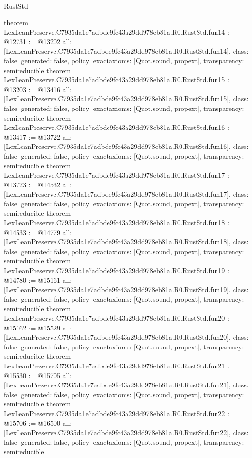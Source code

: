 \begin{lexlean}{RustStd}
\begin{coremodule}
{}
theorem LexLeanPreserve.C7935da1e7adbde9fc43a29dd978eb81a.R0.RustStd.fun14 : @12731 := @13202 {
  all: [LexLeanPreserve.C7935da1e7adbde9fc43a29dd978eb81a.R0.RustStd.fun14],
  class: false,
  generated: false,
  policy: exact{axioms: [Quot.sound, propext]},
  transparency: semireducible
}
theorem LexLeanPreserve.C7935da1e7adbde9fc43a29dd978eb81a.R0.RustStd.fun15 : @13203 := @13416 {
  all: [LexLeanPreserve.C7935da1e7adbde9fc43a29dd978eb81a.R0.RustStd.fun15],
  class: false,
  generated: false,
  policy: exact{axioms: [Quot.sound, propext]},
  transparency: semireducible
}
theorem LexLeanPreserve.C7935da1e7adbde9fc43a29dd978eb81a.R0.RustStd.fun16 : @13417 := @13722 {
  all: [LexLeanPreserve.C7935da1e7adbde9fc43a29dd978eb81a.R0.RustStd.fun16],
  class: false,
  generated: false,
  policy: exact{axioms: [Quot.sound, propext]},
  transparency: semireducible
}
theorem LexLeanPreserve.C7935da1e7adbde9fc43a29dd978eb81a.R0.RustStd.fun17 : @13723 := @14532 {
  all: [LexLeanPreserve.C7935da1e7adbde9fc43a29dd978eb81a.R0.RustStd.fun17],
  class: false,
  generated: false,
  policy: exact{axioms: [Quot.sound, propext]},
  transparency: semireducible
}
theorem LexLeanPreserve.C7935da1e7adbde9fc43a29dd978eb81a.R0.RustStd.fun18 : @14533 := @14779 {
  all: [LexLeanPreserve.C7935da1e7adbde9fc43a29dd978eb81a.R0.RustStd.fun18],
  class: false,
  generated: false,
  policy: exact{axioms: [Quot.sound, propext]},
  transparency: semireducible
}
theorem LexLeanPreserve.C7935da1e7adbde9fc43a29dd978eb81a.R0.RustStd.fun19 : @14780 := @15161 {
  all: [LexLeanPreserve.C7935da1e7adbde9fc43a29dd978eb81a.R0.RustStd.fun19],
  class: false,
  generated: false,
  policy: exact{axioms: [Quot.sound, propext]},
  transparency: semireducible
}
theorem LexLeanPreserve.C7935da1e7adbde9fc43a29dd978eb81a.R0.RustStd.fun20 : @15162 := @15529 {
  all: [LexLeanPreserve.C7935da1e7adbde9fc43a29dd978eb81a.R0.RustStd.fun20],
  class: false,
  generated: false,
  policy: exact{axioms: [Quot.sound, propext]},
  transparency: semireducible
}
theorem LexLeanPreserve.C7935da1e7adbde9fc43a29dd978eb81a.R0.RustStd.fun21 : @15530 := @15705 {
  all: [LexLeanPreserve.C7935da1e7adbde9fc43a29dd978eb81a.R0.RustStd.fun21],
  class: false,
  generated: false,
  policy: exact{axioms: [Quot.sound, propext]},
  transparency: semireducible
}
theorem LexLeanPreserve.C7935da1e7adbde9fc43a29dd978eb81a.R0.RustStd.fun22 : @15706 := @16500 {
  all: [LexLeanPreserve.C7935da1e7adbde9fc43a29dd978eb81a.R0.RustStd.fun22],
  class: false,
  generated: false,
  policy: exact{axioms: [Quot.sound, propext]},
  transparency: semireducible
}
\end{coremodule}
\end{lexlean}
